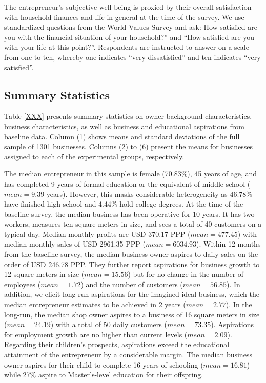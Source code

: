 \documentclass[11.5pt]{article}
\begin{document}
The entrepreneur's subjective well-being is proxied by their overall satisfaction with household finances and life in general at the time of the survey. We use standardized questions from the World Values Survey and ask: How satisfied are you with the financial situation of your household?'' and ``How satisfied are you with your life at this point?''. Respondents are instructed to answer on a scale from one to ten, whereby one indicates ``very dissatisfied'' and ten indicates ``very satisfied''.


\subsection{Summary Statistics}

Table \ref{XXX} presents summary statistics on owner background characteristics, business characteristics, as well as business and educational aspirations from baseline data. Column (1) shows means and standard deviations of the full sample of 1301 businesses. Columns (2) to (6) present the means for businesses assigned to each of the experimental groups, respectively.

The median entrepreneur in this sample is female (70.83\%), 45 years of age, and has completed 9 years of formal education or the equivalent of middle school ($mean = 9.39$ years). However, this masks considerable heterogeneity as 46.78\% have finished high-school and 4.44\% hold college degrees. At the time of the baseline survey, the median business has been operative for 10 years. It has two workers, measures ten square meters in size, and sees a total of 40 customers on a typical day. Median monthly profits are USD 370.17 PPP ($mean = 477.45$) with median monthly sales of USD 2961.35 PPP ($mean = 6034.93$). Within 12 months from the baseline survey, the median business owner aspires to daily sales on the order of USD 246.78 PPP. They further report aspirations for business growth to 12 square meters in size ($mean = 15.56$) but for no change in the number of employees ($mean = 1.72$) and the number of customers ($mean = 56.85$). In addition, we elicit long-run aspirations for the imagined ideal business, which the median entrepreneur estimates to be achieved in 2 years ($mean = 2.77$). In the long-run, the median shop owner aspires to a business of 16 square meters in size ($mean = 24.19$) with a total of 50 daily customers ($mean = 73.35$). Aspirations for employment growth are no higher than current levels ($mean = 2.09$). Regarding their children's prospects, aspirations exceed the educational attainment of the entrepreneur by a considerable margin. The median business owner aspires for their child to complete 16 years of schooling ($mean = 16.81$) while 27\% aspire to Master's-level education for their offspring. %
\end{document}

